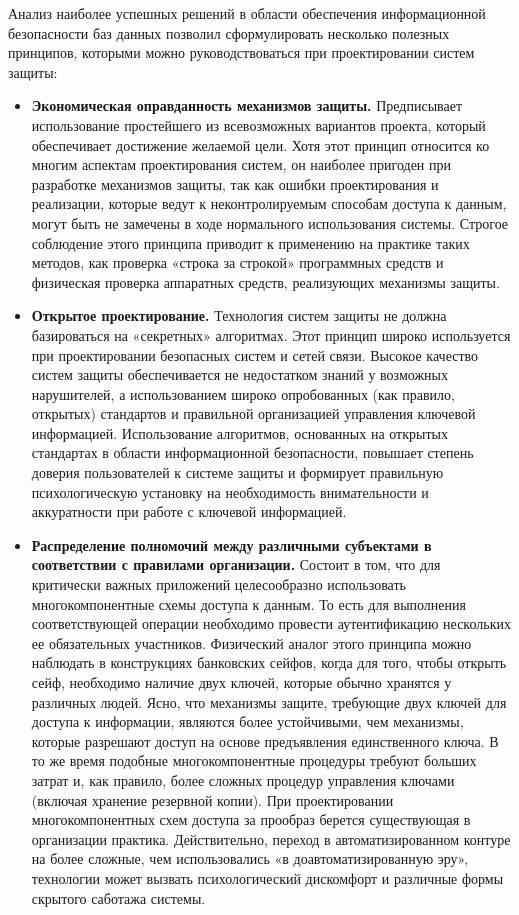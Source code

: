 Анализ наиболее успешных решений в области обеспечения информационной безопасности баз данных
позволил сформулировать несколько полезных принципов, которыми можно руководствоваться
при проектировании систем защиты:
\begin{itemize}
	\item \textbf{Экономическая оправданность механизмов защиты.}
        Предписывает использование простейшего из всевозможных вариантов проекта, который
        обеспечивает достижение желаемой цели. Хотя этот принцип относится ко многим аспектам
        проектирования систем, он наиболее пригоден при разработке механизмов защиты, так как
        ошибки проектирования и реализации, которые ведут к неконтролируемым способам доступа
        к данным, могут быть не замечены в ходе нормального использования системы. Строгое
        соблюдение этого принципа приводит к применению на практике таких методов, как проверка
        «строка за строкой» программных средств и физическая проверка аппаратных средств,
        реализующих механизмы защиты.

    \item \textbf{Открытое проектирование.}
        Технология систем защиты не должна базироваться на «секретных» алгоритмах. Этот принцип
        широко используется при проектировании безопасных систем и сетей связи. Высокое качество
        систем защиты обеспечивается не недостатком знаний у возможных нарушителей,
        а использованием широко опробованных (как правило, открытых) стандартов и правильной
        организацией управления ключевой информацией. Использование алгоритмов, основанных на
        открытых стандартах в области информационной безопасности, повышает степень доверия
        пользователей к системе защиты и формирует правильную психологическую установку на
        необходимость внимательности и аккуратности при работе с ключевой информацией.

	\item \textbf{Распределение полномочий между различными субъектами в соответствии с правилами организации.}
        Состоит в том, что для критически важных приложений целесообразно использовать многокомпонентные
        схемы доступа к данным. То есть для выполнения соответствующей операции необходимо провести
        аутентификацию нескольких ее обязательных участников. Физический аналог этого принципа можно
        наблюдать в конструкциях банковских сейфов, когда для того, чтобы открыть сейф, необходимо наличие
        двух ключей, которые обычно хранятся у различных людей. Ясно, что механизмы защите, требующие двух
        ключей для доступа к информации, являются более устойчивыми, чем механизмы, которые разрешают доступ
        на основе предъявления единственного ключа. В то же время подобные многокомпонентные процедуры требуют
        больших затрат и, как правило, более сложных процедур управления ключами (включая хранение резервной
        копии). При проектировании многокомпонентных схем доступа за прообраз берется существующая в
        организации практика. Действительно, переход в автоматизированном контуре на более сложные,
        чем использовались «в доавтоматизированную эру», технологии может вызвать психологический дискомфорт
        и различные формы скрытого саботажа системы.


\end{itemize}
